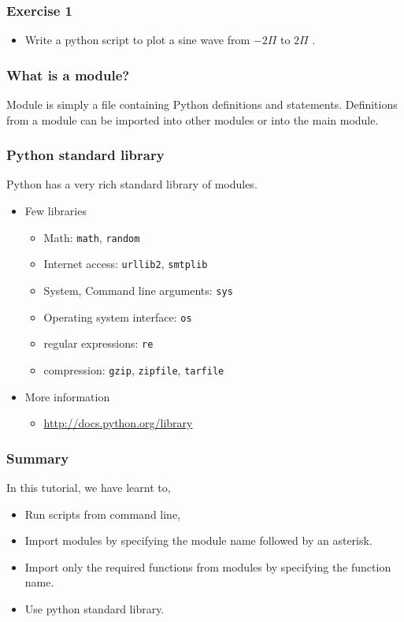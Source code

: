 \documentclass[presentation]{beamer}
\begin{document}
\begin{frame}
\frametitle{Exercise 1}
\label{sec-12}


\begin{itemize}
\item Write a python script to plot a sine wave from 
    $-2\Pi$
  to 
    $2\Pi$
  .
\end{itemize}
\end{frame}
\begin{frame}
\frametitle{What is a module?}
\label{sec-13}

  Module is simply a file containing Python definitions and
  statements. Definitions from a module can be imported into other
  modules or into the main module.
\end{frame}
\begin{frame}
\frametitle{Python standard library}
\label{sec-14}

  Python has a very rich standard library of modules.

\begin{itemize}
\item Few libraries
\begin{itemize}
\item Math: \verb~math~, \verb~random~
\item Internet access: \verb~urllib2~, \verb~smtplib~
\item System, Command line arguments: \verb~sys~
\item Operating system interface: \verb~os~
\item regular expressions: \verb~re~
\item compression: \verb~gzip~, \verb~zipfile~, \verb~tarfile~
\end{itemize}
\item More information
\begin{itemize}
\item \href{http://docs.python.org/library}{http://docs.python.org/library}
\end{itemize}
\end{itemize}
\end{frame}
\begin{frame}
\frametitle{Summary}
\label{sec-15}

  In this tutorial, we have learnt to,


\begin{itemize}
\item Run scripts from command line,
\item Import modules by specifying the module name followed by  
    an asterisk.
\item Import only the required functions from modules by specifying 
    the function name.
\item Use python standard library.
\end{itemize}
\end{frame}
\end{document}
